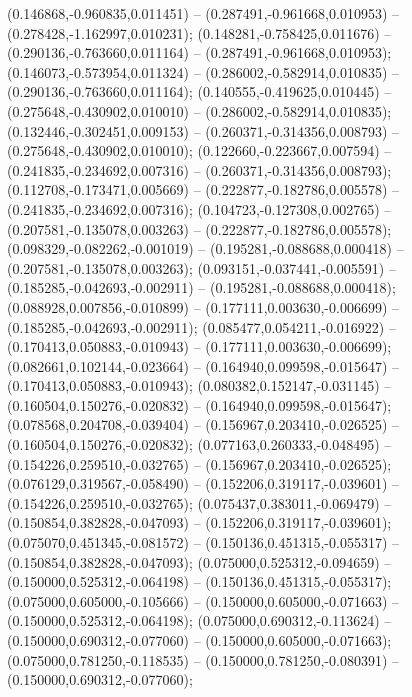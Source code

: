  (0.146868,-0.960835,0.011451) -- (0.287491,-0.961668,0.010953) -- (0.278428,-1.162997,0.010231);
 (0.148281,-0.758425,0.011676) -- (0.290136,-0.763660,0.011164) -- (0.287491,-0.961668,0.010953);
 (0.146073,-0.573954,0.011324) -- (0.286002,-0.582914,0.010835) -- (0.290136,-0.763660,0.011164);
 (0.140555,-0.419625,0.010445) -- (0.275648,-0.430902,0.010010) -- (0.286002,-0.582914,0.010835);
 (0.132446,-0.302451,0.009153) -- (0.260371,-0.314356,0.008793) -- (0.275648,-0.430902,0.010010);
 (0.122660,-0.223667,0.007594) -- (0.241835,-0.234692,0.007316) -- (0.260371,-0.314356,0.008793);
 (0.112708,-0.173471,0.005669) -- (0.222877,-0.182786,0.005578) -- (0.241835,-0.234692,0.007316);
 (0.104723,-0.127308,0.002765) -- (0.207581,-0.135078,0.003263) -- (0.222877,-0.182786,0.005578);
 (0.098329,-0.082262,-0.001019) -- (0.195281,-0.088688,0.000418) -- (0.207581,-0.135078,0.003263);
 (0.093151,-0.037441,-0.005591) -- (0.185285,-0.042693,-0.002911) -- (0.195281,-0.088688,0.000418);
 (0.088928,0.007856,-0.010899) -- (0.177111,0.003630,-0.006699) -- (0.185285,-0.042693,-0.002911);
 (0.085477,0.054211,-0.016922) -- (0.170413,0.050883,-0.010943) -- (0.177111,0.003630,-0.006699);
 (0.082661,0.102144,-0.023664) -- (0.164940,0.099598,-0.015647) -- (0.170413,0.050883,-0.010943);
 (0.080382,0.152147,-0.031145) -- (0.160504,0.150276,-0.020832) -- (0.164940,0.099598,-0.015647);
 (0.078568,0.204708,-0.039404) -- (0.156967,0.203410,-0.026525) -- (0.160504,0.150276,-0.020832);
 (0.077163,0.260333,-0.048495) -- (0.154226,0.259510,-0.032765) -- (0.156967,0.203410,-0.026525);
 (0.076129,0.319567,-0.058490) -- (0.152206,0.319117,-0.039601) -- (0.154226,0.259510,-0.032765);
 (0.075437,0.383011,-0.069479) -- (0.150854,0.382828,-0.047093) -- (0.152206,0.319117,-0.039601);
 (0.075070,0.451345,-0.081572) -- (0.150136,0.451315,-0.055317) -- (0.150854,0.382828,-0.047093);
 (0.075000,0.525312,-0.094659) -- (0.150000,0.525312,-0.064198) -- (0.150136,0.451315,-0.055317);
 (0.075000,0.605000,-0.105666) -- (0.150000,0.605000,-0.071663) -- (0.150000,0.525312,-0.064198);
 (0.075000,0.690312,-0.113624) -- (0.150000,0.690312,-0.077060) -- (0.150000,0.605000,-0.071663);
 (0.075000,0.781250,-0.118535) -- (0.150000,0.781250,-0.080391) -- (0.150000,0.690312,-0.077060);
